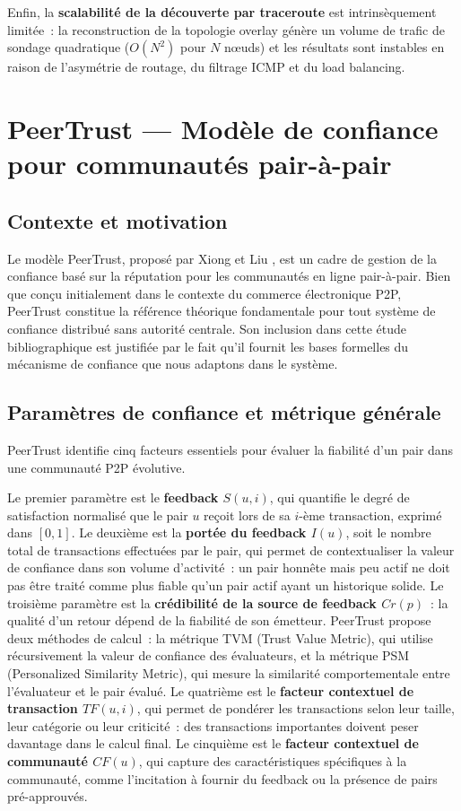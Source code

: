 Enfin, la \textbf{scalabilité de la découverte par traceroute} est intrinsèquement limitée~: la reconstruction de la topologie overlay génère un volume de trafic de sondage quadratique ($O(N^2)$ pour $N$ n\oe{}uds) et les résultats sont instables en raison de l'asymétrie de routage, du filtrage ICMP et du load balancing.

\section{PeerTrust --- Modèle de confiance pour communautés pair-à-pair}
\label{sec:peertrust}

\subsection{Contexte et motivation}

Le modèle PeerTrust, proposé par Xiong et Liu \parencite{xiong2004peertrust}, est un cadre de gestion de la confiance basé sur la réputation pour les communautés en ligne pair-à-pair. Bien que conçu initialement dans le contexte du commerce électronique P2P, PeerTrust constitue la référence théorique fondamentale pour tout système de confiance distribué sans autorité centrale. Son inclusion dans cette étude bibliographique est justifiée par le fait qu'il fournit les bases formelles du mécanisme de confiance que nous adaptons dans le système.

\subsection{Paramètres de confiance et métrique générale}

PeerTrust identifie cinq facteurs essentiels pour évaluer la fiabilité d'un pair dans une communauté P2P évolutive.

Le premier paramètre est le \textbf{feedback $S(u,i)$}, qui quantifie le degré de satisfaction normalisé que le pair $u$ reçoit lors de sa $i$-ème transaction, exprimé dans $[0,1]$. Le deuxième est la \textbf{portée du feedback $I(u)$}, soit le nombre total de transactions effectuées par le pair, qui permet de contextualiser la valeur de confiance dans son volume d'activité~: un pair honnête mais peu actif ne doit pas être traité comme plus fiable qu'un pair actif ayant un historique solide. Le troisième paramètre est la \textbf{crédibilité de la source de feedback $Cr(p)$}~: la qualité d'un retour dépend de la fiabilité de son émetteur. PeerTrust propose deux méthodes de calcul~: la métrique TVM (Trust Value Metric), qui utilise récursivement la valeur de confiance des évaluateurs, et la métrique PSM (Personalized Similarity Metric), qui mesure la similarité comportementale entre l'évaluateur et le pair évalué. Le quatrième est le \textbf{facteur contextuel de transaction $TF(u,i)$}, qui permet de pondérer les transactions selon leur taille, leur catégorie ou leur criticité~: des transactions importantes doivent peser davantage dans le calcul final. Le cinquième est le \textbf{facteur contextuel de communauté $CF(u)$}, qui capture des caractéristiques spécifiques à la communauté, comme l'incitation à fournir du feedback ou la présence de pairs pré-approuvés.

